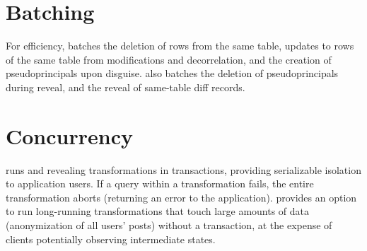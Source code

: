 \section{Batching}
%
For efficiency, \sys batches the deletion of rows from the same table, updates
to rows of the same table from modifications and decorrelation, and the creation
of pseudoprincipals upon disguise. 
%
\sys also batches the deletion of pseudoprincipals during reveal, and 
the reveal of same-table diff records.
%

%
\section{Concurrency}
%
\sys runs \xxing and revealing transformations in transactions, providing
serializable isolation to application users.
%
If a query within a transformation fails, the entire transformation aborts
(returning an error to the application).
%
\sys provides an option to run long-running transformations that
touch large amounts of data (\eg anonymization of all users' posts) without a
transaction, at the expense of clients potentially observing intermediate
states.
%


%
%

%

